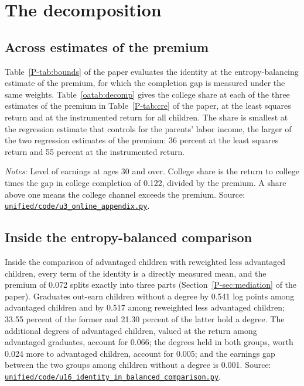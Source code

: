 \documentclass[11pt]{article}
\numberwithin{equation}{section}
\newcommand{\repourl}{https://github.com/JiachenJin1001/family-background-earnings-china}
\newcommand{\code}[1]{\href{\repourl/blob/main/#1}{\nolinkurl{#1}}}
\begin{document}
\section{The decomposition}
\label{oa:decomposition}

\subsection{Across estimates of the premium}

Table~\ref{P-tab:bounds} of the paper evaluates the identity at the
entropy-balancing estimate of the premium, for which the completion gap
is measured under the same weights. Table~\ref{oatab:decomp} gives the
college share at each of the three estimates of the premium in
Table~\ref{P-tab:cre} of the paper, at the least squares return and at
the instrumented return for all children. The share is smallest at the
regression estimate that controls for the parents' labor income, the larger of the two regression estimates of the premium: 36 percent at the least
squares return and 55 percent at the instrumented return.

\begin{table}[H]
\centering
\small
\caption{The college share of the premium across estimates of the
premium.}
\label{oatab:decomp}
\setlength{\tabcolsep}{4pt}

\par\smallskip
\begin{minipage}{0.94\textwidth}
\footnotesize\emph{Notes:} Level of earnings at ages 30 and over. College share is the
return to college times the gap in college completion of 0.122,
divided by the premium. A share above one means the college channel
exceeds the premium. Source: \code{unified/code/u3_online_appendix.py}.
\end{minipage}
\end{table}

\subsection{Inside the entropy-balanced comparison}

Inside the comparison of advantaged children with reweighted less advantaged children, every term of the identity is a directly measured mean, and the premium of 0.072 splits exactly into three parts (Section~\ref{P-sec:mediation} of the paper). Graduates out-earn children without a degree by 0.541 log points among advantaged children and by 0.517 among reweighted less advantaged children; 33.55 percent of the former and 21.30 percent of the latter hold a degree. The additional degrees of advantaged children, valued at the return among advantaged graduates, account for 0.066; the degrees held in both groups, worth 0.024 more to advantaged children, account for 0.005; and the earnings gap between the two groups among children without a degree is 0.001. Source: \code{unified/code/u16_identity_in_balanced_comparison.py}.





{\small
}
\end{document}
